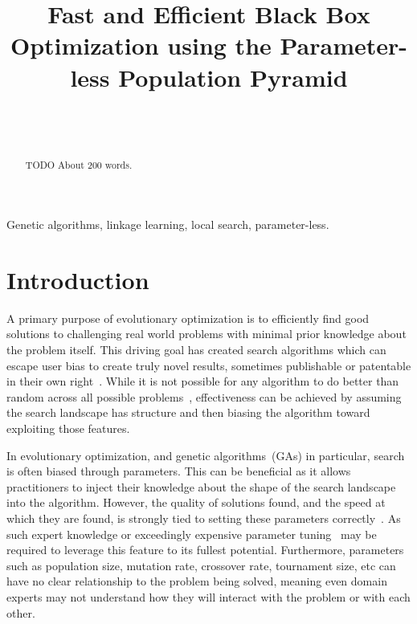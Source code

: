 \documentclass[twoside]{article}
\begin{document}
\title{\bf Fast and Efficient Black Box Optimization using the Parameter-less Population Pyramid}  

\author{ \hfill {}\\ 
\AND
        \hfill {}\\
}

\maketitle

\begin{abstract}

TODO About 200 words.

\end{abstract}

\begin{keywords}

Genetic algorithms, 
linkage learning,
local search,
parameter-less.

\end{keywords}

\section{Introduction}
A primary purpose of evolutionary optimization is to efficiently find good solutions
to challenging real world problems with minimal prior knowledge about the problem itself.
This driving goal has created search algorithms which can escape user bias to create
truly novel results, sometimes publishable or patentable in their own right~\citep{kannappan:2014:humies}.
While it is not possible for any algorithm to do better than random across all possible
problems~\citep{Wolpert:1997:nfl}, effectiveness can be achieved by assuming the search
landscape has structure and then biasing the algorithm toward exploiting those features.

In evolutionary optimization, and genetic algorithms~(GAs) in particular, search is often
biased through parameters. This can be beneficial as it allows practitioners to inject their
knowledge about the shape of the search landscape into the algorithm.
However, the quality of solutions found, and the speed at which they are found, is strongly tied to setting these parameters
correctly~\citep{goldberg:1991:gasize}. As such expert knowledge or exceedingly
expensive parameter tuning~\citep{grefenstette:1986:optimalga} may be required to leverage
this feature to its fullest potential. Furthermore,  parameters such as population size, mutation rate, crossover
rate, tournament size, etc can have no clear relationship to the problem being solved, meaning even
domain experts may not understand how they will interact with the problem or with each other.
\end{document}
